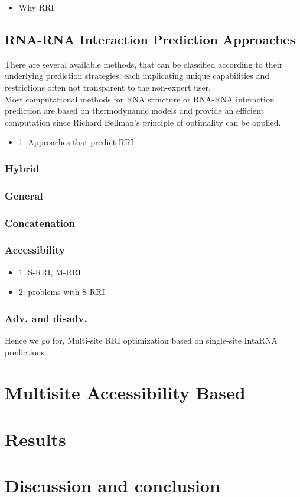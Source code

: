 \documentclass[twoside,a4paper]{report}
\begin{document}
 	\begin{itemize}
 	\item Why RRI
 	\end{itemize}

	\section{RNA-RNA Interaction Prediction Approaches}
	There are several available methods, that can be classified according to their underlying prediction strategies, each implicating unique capabilities and restrictions often not transparent to the non-expert user.\\ 
	Most computational methods for RNA structure or RNA-RNA interaction prediction
	are based on thermodynamic models and provide an efficient computation since Richard Bellman’s principle of optimality \cite{raden2018interactive} can be applied.
	
	\begin{itemize}
	\item 1. Approaches that predict RRI
	\end{itemize}
	
	\subsection{Hybrid}
	\subsection{General}
	\subsection{Concatenation}
	\subsection{Accessibility}
		\begin{itemize}
		\item 1. S-RRI, M-RRI
		\item 2. problems with S-RRI
	    \end{itemize}
	\subsection{Adv. and disadv.}
		Hence we go for, Multi-site RRI optimization based on single-site IntaRNA predictions.
		
	\chapter{Multisite Accessibility Based  }
	\chapter{Results}
	\chapter{Discussion and conclusion}
	
	
	
	

	
\end{document}
